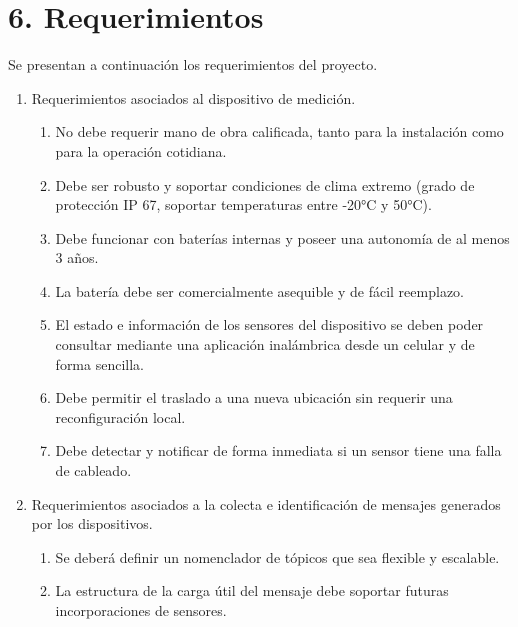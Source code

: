 \documentclass[
11pt, %
]{charter}
\begin{document}
\section{6. Requerimientos}
\label{sec:requerimientos}
Se presentan a continuación los requerimientos del proyecto.
\begin{enumerate}
	\item Requerimientos asociados al dispositivo de medición.
		\begin{enumerate}
			\item No debe requerir mano de obra calificada, tanto para la instalación como para la operación cotidiana.
			\item Debe ser robusto y soportar condiciones de clima extremo (grado de protección IP 67, soportar temperaturas entre -20°C y 50°C).
			\item Debe funcionar con baterías internas y poseer una autonomía de al menos 3 años.
			\item La batería debe ser comercialmente asequible y de fácil reemplazo.
			\item El estado e información de los sensores del dispositivo se deben poder consultar mediante una aplicación inalámbrica desde un celular y de forma sencilla.
			\item Debe permitir el traslado a una nueva ubicación sin requerir una reconfiguración local.
			\item Debe detectar y notificar de forma inmediata si un sensor tiene una falla de cableado.
		\end{enumerate}
		
	\item Requerimientos asociados a la colecta e identificación de mensajes generados por los dispositivos.
		\begin{enumerate}
			\item Se deberá definir un nomenclador de tópicos que sea flexible y escalable.
			\item La estructura de la carga útil del mensaje debe soportar futuras  incorporaciones de sensores.
		\end{enumerate}


\end{enumerate}
\end{document}
